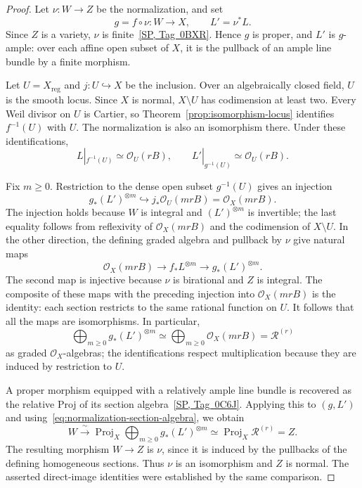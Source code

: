 \documentclass[11pt,a4paper]{article}
\theoremstyle{definition}
\theoremstyle{definition}
\DeclareMathOperator{\Proj}{Proj}
\newcommand{\OO}{\mathcal O}
\newcommand{\RR}{\mathcal R}
\begin{document}
\begin{proof}
Let $\nu\colon W\to Z$ be the normalization, and set
\[
 g=f\circ\nu\colon W\to X,
 \qquad L'=\nu^*L.
\]
Since $Z$ is a variety, $\nu$ is finite~\href{https://stacks.math.columbia.edu/tag/0BXR}{[SP, Tag~0BXR]}. Hence $g$ is proper, and $L'$ is $g$-ample: over each affine open subset of $X$, it is the pullback of an ample line bundle by a finite morphism.

Let $U=X_{\mathrm{reg}}$ and $j\colon U\hookrightarrow X$ be the inclusion. Over an algebraically closed field, $U$ is the smooth locus. Since $X$ is normal, $X\setminus U$ has codimension at least two. Every Weil divisor on $U$ is Cartier, so Theorem~\ref{prop:isomorphism-locus} identifies $f^{-1}(U)$ with $U$. The normalization is also an isomorphism there. Under these identifications,
\[
 L|_{f^{-1}(U)}\simeq\OO_U(rB),
 \qquad
 L'|_{g^{-1}(U)}\simeq\OO_U(rB).
\]

Fix $m\ge0$. Restriction to the dense open subset $g^{-1}(U)$ gives an injection
\[
 g_*(L')^{\otimes m}
 \hookrightarrow j_*\OO_U(mrB)
 =\OO_X(mrB).
\]
The injection holds because $W$ is integral and $(L')^{\otimes m}$ is invertible; the last equality follows from reflexivity of $\OO_X(mrB)$ and the codimension of $X\setminus U$. In the other direction, the defining graded algebra and pullback by $\nu$ give natural maps
\[
 \OO_X(mrB)\longrightarrow f_*L^{\otimes m}
 \longrightarrow g_*(L')^{\otimes m}.
\]
The second map is injective because $\nu$ is birational and $Z$ is integral. The composite of these maps with the preceding injection into $\OO_X(mrB)$ is the identity: each section restricts to the same rational function on $U$. It follows that all the maps are isomorphisms. In particular,
\begin{equation}\label{eq:normalization-section-algebra}
 \bigoplus_{m\ge0}g_*(L')^{\otimes m}
 \simeq\bigoplus_{m\ge0}\OO_X(mrB)
 =\RR^{(r)}
\end{equation}
as graded $\OO_X$-algebras; the identifications respect multiplication because they are induced by restriction to $U$.

A proper morphism equipped with a relatively ample line bundle is recovered as the relative Proj of its section algebra~\href{https://stacks.math.columbia.edu/tag/0C6J}{[SP, Tag~0C6J]}. Applying this to $(g,L')$ and using~\eqref{eq:normalization-section-algebra}, we obtain
\[
 W\xrightarrow{\ \sim\ }
 \Proj_X\bigoplus_{m\ge0}g_*(L')^{\otimes m}
 \simeq\Proj_X\RR^{(r)}=Z.
\]
The resulting morphism $W\to Z$ is $\nu$, since it is induced by the pullbacks of the defining homogeneous sections. Thus $\nu$ is an isomorphism and $Z$ is normal. The asserted direct-image identities were established by the same comparison.
\end{proof}
\end{document}
